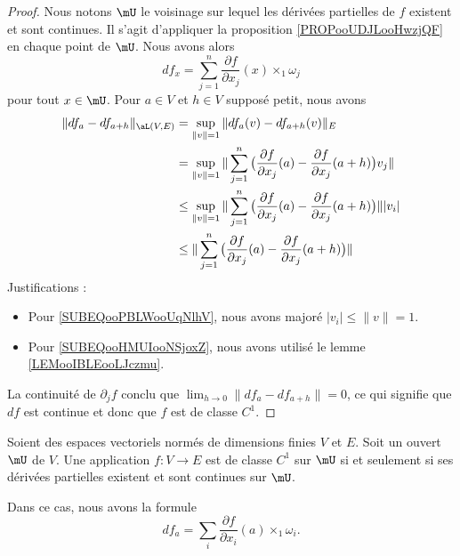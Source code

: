 \begin{proof}
    Nous notons \( \mU\) le voisinage sur lequel les dérivées partielles de \( f\) existent et sont continues. Il s'agit d'appliquer la proposition \ref{PROPooUDJLooHwzjQF} en chaque point de \( \mU\). Nous avons alors
    \begin{equation}
        df_x=\sum_{j=1}^n\frac{ \partial f }{ \partial x_j }(x)\times_1\omega_j
    \end{equation}
    pour tout \( x\in \mU\). Pour \( a\in V\) et \( h\in V\) supposé petit, nous avons
    \begin{subequations}
        \begin{align}
            \| df_a-df_{a+h} \|_{\aL(V,E)}&=\sup_{\| v \|=1}\| df_a(v)-df_{a+h}(v) \|_E\\
            &=\sup_{\| v \|=1}\| \sum_{j=1}^n\big( \frac{ \partial f }{ \partial x_j }(a)-\frac{ \partial f }{ \partial x_j }(a+h) \big)v_j \|\\
            &\leq \sup_{\| v \|=1}\| \sum_{j=1}^n\big( \frac{ \partial f }{ \partial x_j }(a)-\frac{ \partial f }{ \partial x_j }(a+h) \big) \| |v_i |     \label{SUBEQooHMUIooNSjoxZ}\\
            &\leq\| \sum_{j=1}^n\big( \frac{ \partial f }{ \partial x_j }(a)-\frac{ \partial f }{ \partial x_j }(a+h) \big) \|      \label{SUBEQooPBLWooUqNlhV}
        \end{align}
    \end{subequations}
    Justifications :
    \begin{itemize}
        \item 
            Pour \eqref{SUBEQooPBLWooUqNlhV}, nous avons majoré \( | v_i |\leq \| v \|=1\).
        \item
            Pour \eqref{SUBEQooHMUIooNSjoxZ}, nous avons utilisé le lemme \ref{LEMooIBLEooLJczmu}.
    \end{itemize}
    La continuité de \( \partial_jf\) conclu que \( \lim_{h\to 0}\|  df_a-df_{a+h}  \|=0\), ce qui signifie que \( df\) est continue et donc que \( f\) est de classe \( C^1\).
\end{proof}
 
\begin{theorem}     \label{THOooBEAOooBdvOdr}
    Soient des espaces vectoriels normés de dimensions finies \( V\) et \( E\). Soit un ouvert \( \mU\) de \( V\). Une application \( f\colon V\to E\) est de classe \( C^1\) sur \( \mU\) si et seulement si ses dérivées partielles existent et sont continues sur \( \mU\).

    Dans ce cas, nous avons la formule
    \begin{equation}        \label{EQooPREWooVHVIAF}
        df_a=\sum_i\frac{ \partial f }{ \partial x_i }(a)\times_1 \omega_i.
    \end{equation}
\end{theorem}


